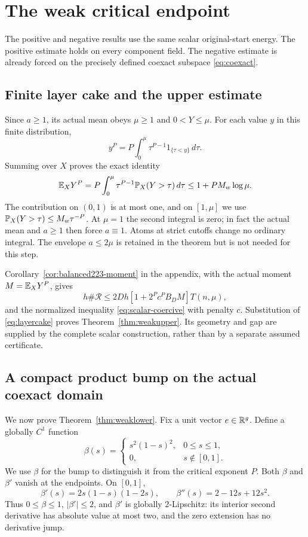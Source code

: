 \section{The weak critical endpoint}\label{sec:endpoint}
The positive and negative results use the same scalar original-start energy.
The positive estimate holds on every component field. The negative estimate
is already forced on the precisely defined coexact subspace
\eqref{eq:coexact}.

\subsection{Finite layer cake and the upper estimate}
Since $a\ge1$, its actual mean obeys $\mu\ge1$ and $0<Y\le\mu$.
For each value $y$ in this finite distribution,
\[
 y^P=P\int_0^\mu\tau^{P-1}1_{\{\tau<y\}}\,d\tau.
\]
Summing over $X$ proves the exact identity
\begin{equation}\label{eq:layercake}
 \mathbb E_X Y^P=P\int_0^\mu\tau^{P-1}\mathbb P_X(Y>\tau)\,d\tau
                   \le1+P M_w\log\mu.
\end{equation}
The contribution on $(0,1)$ is at most one, and on $[1,\mu]$ we use
$\mathbb P_X(Y>\tau)\le M_w\tau^{-P}$. At $\mu=1$ the second integral is zero;
in fact the actual mean and $a\ge1$ then force $a\equiv1$.
Atoms at strict cutoffs change no ordinary integral. The envelope
$a\le2\mu$ is retained in the theorem but is not needed for this step.

Corollary~\ref{cor:balanced223-moment} in the appendix, with the actual
moment $M=\mathbb E_X Y^P$, gives
\[
 h\#\mathcal R\le2Dh[1+2^Pc^PB_DM]T(n,\mu),
\]
and the normalized inequality \eqref{eq:scalar-coercive} with penalty $c$.
Substitution of \eqref{eq:layercake} proves
Theorem~\ref{thm:weakupper}. Its geometry and gap are supplied by the
complete scalar construction, rather than by a separate assumed certificate.

\subsection{A compact product bump on the actual coexact domain}
We now prove Theorem~\ref{thm:weaklower}. Fix a unit vector $e\in\mathbb R^g$.
Define a globally $C^1$ function
\[
 \beta(s)=\begin{cases}s^2(1-s)^2,&0\le s\le1,\\0,&s\notin[0,1].\end{cases}
\]
We use $\beta$ for the bump to distinguish it from the critical exponent
$P$. Both $\beta$ and $\beta'$ vanish at the endpoints. On $[0,1]$,
\[
 \beta'(s)=2s(1-s)(1-2s),\qquad
 \beta''(s)=2-12s+12s^2.
\]
Thus $0\le\beta\le1$, $|\beta'|\le2$, and $\beta'$ is globally
$2$-Lipschitz: its interior second derivative has absolute value at most two,
and the zero extension has no derivative jump.

